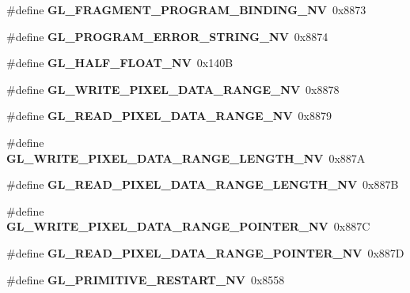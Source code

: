 \begin{DoxyCompactItemize}
\item 
\#define {\bfseries G\+L\+\_\+\+F\+R\+A\+G\+M\+E\+N\+T\+\_\+\+P\+R\+O\+G\+R\+A\+M\+\_\+\+B\+I\+N\+D\+I\+N\+G\+\_\+\+N\+V}~0x8873\label{_s_d_l__opengl_8h_a04cdfb866258d7332d7a5a90fb2ca7b1}

\item 
\#define {\bfseries G\+L\+\_\+\+P\+R\+O\+G\+R\+A\+M\+\_\+\+E\+R\+R\+O\+R\+\_\+\+S\+T\+R\+I\+N\+G\+\_\+\+N\+V}~0x8874\label{_s_d_l__opengl_8h_a8e3a12aaa4b6ed9d0dfeb5b5e4d85abf}

\item 
\#define {\bfseries G\+L\+\_\+\+H\+A\+L\+F\+\_\+\+F\+L\+O\+A\+T\+\_\+\+N\+V}~0x140\+B\label{_s_d_l__opengl_8h_a253eb425a04047d1ebef6212663edb40}

\item 
\#define {\bfseries G\+L\+\_\+\+W\+R\+I\+T\+E\+\_\+\+P\+I\+X\+E\+L\+\_\+\+D\+A\+T\+A\+\_\+\+R\+A\+N\+G\+E\+\_\+\+N\+V}~0x8878\label{_s_d_l__opengl_8h_a9c8addc67c3239f81d994fd594030b4e}

\item 
\#define {\bfseries G\+L\+\_\+\+R\+E\+A\+D\+\_\+\+P\+I\+X\+E\+L\+\_\+\+D\+A\+T\+A\+\_\+\+R\+A\+N\+G\+E\+\_\+\+N\+V}~0x8879\label{_s_d_l__opengl_8h_a82071036af78e8d252a73705853a6bba}

\item 
\#define {\bfseries G\+L\+\_\+\+W\+R\+I\+T\+E\+\_\+\+P\+I\+X\+E\+L\+\_\+\+D\+A\+T\+A\+\_\+\+R\+A\+N\+G\+E\+\_\+\+L\+E\+N\+G\+T\+H\+\_\+\+N\+V}~0x887\+A\label{_s_d_l__opengl_8h_a5f35011157007ff9d591444edc4da526}

\item 
\#define {\bfseries G\+L\+\_\+\+R\+E\+A\+D\+\_\+\+P\+I\+X\+E\+L\+\_\+\+D\+A\+T\+A\+\_\+\+R\+A\+N\+G\+E\+\_\+\+L\+E\+N\+G\+T\+H\+\_\+\+N\+V}~0x887\+B\label{_s_d_l__opengl_8h_ae89f6f39673fdca7a0f66faf56cdfa20}

\item 
\#define {\bfseries G\+L\+\_\+\+W\+R\+I\+T\+E\+\_\+\+P\+I\+X\+E\+L\+\_\+\+D\+A\+T\+A\+\_\+\+R\+A\+N\+G\+E\+\_\+\+P\+O\+I\+N\+T\+E\+R\+\_\+\+N\+V}~0x887\+C\label{_s_d_l__opengl_8h_accace2ba150699c99a88479848da7411}

\item 
\#define {\bfseries G\+L\+\_\+\+R\+E\+A\+D\+\_\+\+P\+I\+X\+E\+L\+\_\+\+D\+A\+T\+A\+\_\+\+R\+A\+N\+G\+E\+\_\+\+P\+O\+I\+N\+T\+E\+R\+\_\+\+N\+V}~0x887\+D\label{_s_d_l__opengl_8h_abc16b6d79de9de947eb13c597d8054eb}

\item 
\#define {\bfseries G\+L\+\_\+\+P\+R\+I\+M\+I\+T\+I\+V\+E\+\_\+\+R\+E\+S\+T\+A\+R\+T\+\_\+\+N\+V}~0x8558\label{_s_d_l__opengl_8h_a999db7d2d9673547a8d88d5521396e0c}


\end{DoxyCompactItemize}
